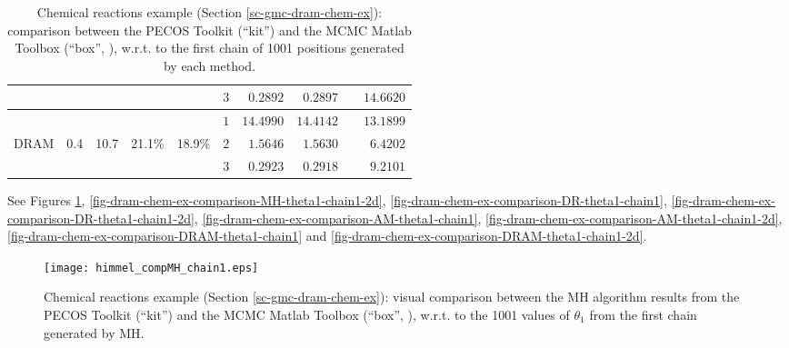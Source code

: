 \begin{table}[h!]
\begin{center}
\begin{tabular}{|c|c|c|c|c|c|r|r|r|r|}
\cline{6-10}
       &                &                  &               &                   & $3$ &  $0.2892$            &  $0.2897$              &                         & $14.6620$                \\
\hline
\hline
       &                &                  &               &                   & $1$ & $14.4990$            & $14.4142$              &                         & $13.1899$                \\
\cline{6-10}
DRAM   & 0.4            & 10.7             & 21.1\%        & 18.9\%            & $2$ &  $1.5646$            &  $1.5630$              &                         &  $6.4202$                \\
\cline{6-10}
       &                &                  &               &                   & $3$ &  $0.2923$            &  $0.2918$              &                         &  $9.2101$                \\
\hline
\end{tabular}
\caption{Chemical reactions example (Section \ref{sc-gmc-dram-chem-ex}):
comparison between the PECOS Toolkit (``kit'') and the MCMC Matlab Toolbox (``box'', \cite{mcmctool}), w.r.t. to the first chain of 1001 positions generated by each method.
}
\label{tab-dram-chem-ex-comparison}
\end{center}
\end{table}

See Figures
\ref{fig-dram-chem-ex-comparison-MH-theta1-chain1},
\ref{fig-dram-chem-ex-comparison-MH-theta1-chain1-2d},
\ref{fig-dram-chem-ex-comparison-DR-theta1-chain1},
\ref{fig-dram-chem-ex-comparison-DR-theta1-chain1-2d},
\ref{fig-dram-chem-ex-comparison-AM-theta1-chain1},
\ref{fig-dram-chem-ex-comparison-AM-theta1-chain1-2d},
\ref{fig-dram-chem-ex-comparison-DRAM-theta1-chain1} and
\ref{fig-dram-chem-ex-comparison-DRAM-theta1-chain1-2d}.

\begin{figure}[h!]
\begin{center}
\texttt{[image: himmel\_compMH\_chain1.eps]}
\end{center}
\caption{Chemical reactions example (Section \ref{sc-gmc-dram-chem-ex}):
visual comparison between the MH algorithm results from the PECOS Toolkit (``kit'') and the MCMC Matlab Toolbox (``box'', \cite{mcmctool}), w.r.t. to the 1001 values of $\theta_1$ from the first chain generated by MH.
}
\label{fig-dram-chem-ex-comparison-MH-theta1-chain1}
\end{figure}

